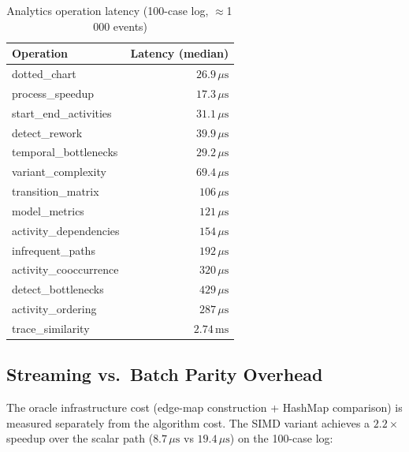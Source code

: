 \documentclass[12pt,a4paper]{article}
\begin{document}
\begin{table}[H]
  \centering
  \caption{Analytics operation latency (100-case log, $\approx$1\,000 events)}
  \label{tab:analytics}
  \begin{tabular}{lr}
    \toprule
    \textbf{Operation} & \textbf{Latency (median)} \\
    \midrule
    dotted\_chart           & $26.9\,\mu\text{s}$ \\
    process\_speedup        & $17.3\,\mu\text{s}$ \\
    start\_end\_activities  & $31.1\,\mu\text{s}$ \\
    detect\_rework          & $39.9\,\mu\text{s}$ \\
    temporal\_bottlenecks   & $29.2\,\mu\text{s}$ \\
    variant\_complexity     & $69.4\,\mu\text{s}$ \\
    transition\_matrix      & $106\,\mu\text{s}$  \\
    model\_metrics          & $121\,\mu\text{s}$  \\
    activity\_dependencies  & $154\,\mu\text{s}$  \\
    infrequent\_paths       & $192\,\mu\text{s}$  \\
    activity\_cooccurrence  & $320\,\mu\text{s}$  \\
    detect\_bottlenecks     & $429\,\mu\text{s}$  \\
    activity\_ordering      & $287\,\mu\text{s}$  \\
    trace\_similarity       & $2.74\,\text{ms}$   \\
    \bottomrule
  \end{tabular}
\end{table}

\subsection{Streaming vs.\ Batch Parity Overhead}

The oracle infrastructure cost (edge-map construction + HashMap comparison) is
measured separately from the algorithm cost. The SIMD variant achieves a
$2.2\times$ speedup over the scalar path ($8.7\,\mu\text{s}$ vs
$19.4\,\mu\text{s}$) on the 100-case log:
\end{document}

